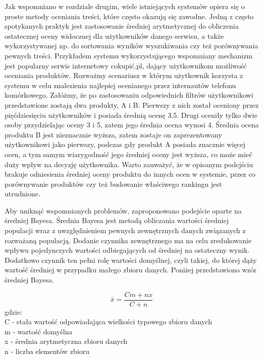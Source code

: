 Jak wspomniano w rozdziale drugim, wiele istniejących systemów opiera się o proste metody oceniania treści, które często okazują się zawodne. Jedną z często spotykanych praktyk jest zastosowanie średniej arytmetycznej do obliczenia ostatecznej oceny widocznej dla użytkowników danego serwisu, a także wykorzystywanej np. do sortowania wyników wyszukiwania czy też porównywania pewnych treści. Przykładem systemu wykorzystującego wspomniany mechanizm jest popularny serwis internetowy cokupić.pl, dający użytkownikom możliwość oceniania produktów. Rozważmy scenariusz w którym użytkownik korzysta z systemu w celu znalezienia najlepiej ocenianego przez internautów telefonu komórkowego. Załóżmy, że po zastosowaniu odpowiednich filtrów użytkownikowi przedstawione zostają dwa produkty, A i B. Pierwszy z nich został oceniony przez pięćdziesięciu użytkowników i posiada średnią ocenę 3.5. Drugi oceniły tylko dwie osoby przydzielając oceny 3 i 5, zatem jego średnia ocena wynosi 4. Średnia ocena produktu B jest nieznacznie wyższa, zatem zostaje on zaprezentowany użytkownikowi jako pierwszy, podczas gdy produkt A posiada znacznie więcej ocen, a tym samym wiarygodność jego średniej oceny jest wyższa, co może mieć duży wpływ na decyzję użytkownika. Warto zauważyć, że w opisanym podejściu brakuje odniesienia średniej oceny produktu do innych ocen w systemie, przez co porównywanie produktów czy też budowanie właściwego rankingu jest utrudnione.

Aby uniknąć wspomnianych problemów, zaproponowano podejście oparte na średniej Bayesa. Średnia Bayesa jest metodą obliczania wartości średniej populacji wraz z uwzględnieniem pewnych zewnętrznych danych związanych z rozważaną populacją. Dodanie czynnika zewnętrznego ma na celu zredukowanie wpływu pojedynczych wartości odbiegających od średniej na ostateczny wynik. Dodatkowo czynnik ten pełni rolę wartości domyślnej, czyli takiej, do której dąży wartość średniej w przypadku małego zbioru danych.\cite{bayesWiki} Poniżej przedstawiono wzór średniej Bayesa.

\begin{equation}
\bar{x}=\frac{Cm+nx}{C+n}
\end{equation}
gdzie:\\
C - stała wartość odpowiadająca wielkości typowego zbioru danych\\
m - wartość domyślna\\
x - średnia arytmetyczna zbioru danych\\
n - liczba elementów zbioru\\


